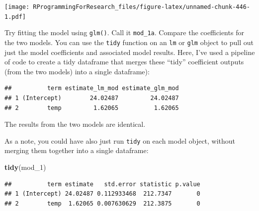\documentclass[]{book}
\makeatletter
\newenvironment{Shaded}{\begin{snugshade}}{\end{snugshade}}
\newcommand{\KeywordTok}[1]{\textcolor[rgb]{0.13,0.29,0.53}{\textbf{#1}}}
\newcommand{\DataTypeTok}[1]{\textcolor[rgb]{0.13,0.29,0.53}{#1}}
\newcommand{\DecValTok}[1]{\textcolor[rgb]{0.00,0.00,0.81}{#1}}
\newcommand{\StringTok}[1]{\textcolor[rgb]{0.31,0.60,0.02}{#1}}
\newcommand{\OperatorTok}[1]{\textcolor[rgb]{0.81,0.36,0.00}{\textbf{#1}}}
\newcommand{\NormalTok}[1]{#1}
\newenvironment{kframe}{%
\medskip{}
\setlength{\fboxsep}{.8em}
 \def\at@end@of@kframe{}%
 \ifinner\ifhmode%
  \def\at@end@of@kframe{\end{minipage}}%
  \begin{minipage}{\columnwidth}%
 \fi\fi%
 \def\FrameCommand##1{\hskip\@totalleftmargin \hskip-\fboxsep
 \colorbox{shadecolor}{##1}\hskip-\fboxsep
     \hskip-\linewidth \hskip-\@totalleftmargin \hskip\columnwidth}%
 \MakeFramed {\advance\hsize-\width
   \@totalleftmargin\z@ \linewidth\hsize
   \@setminipage}}%
 {\par\unskip\endMakeFramed%
 \at@end@of@kframe}
\renewenvironment{Shaded}{\begin{kframe}}{\end{kframe}}
\theoremstyle{definition}
\theoremstyle{definition}
\theoremstyle{definition}
\theoremstyle{remark}
\makeatother
\begin{document}
\texttt{[image: RProgrammingForResearch\_files/figure-latex/unnamed-chunk-446-1.pdf]}

Try fitting the model using \texttt{glm()}. Call it \texttt{mod\_1a}.
Compare the coefficients for the two models. You can use the
\texttt{tidy} function on an \texttt{lm} or \texttt{glm} object to pull
out just the model coefficients and associated model results. Here, I've
used a pipeline of code to create a tidy dataframe that merges these
``tidy'' coefficient outputs (from the two models) into a single
dataframe):

\begin{Shaded}
\end{Shaded}

\begin{verbatim}
##          term estimate_lm_mod estimate_glm_mod
## 1 (Intercept)        24.02487         24.02487
## 2        temp         1.62065          1.62065
\end{verbatim}

The results from the two models are identical.

As a note, you could have also just run \texttt{tidy} on each model
object, without merging them together into a single dataframe:

\begin{Shaded}
\begin{Highlighting}[]
\KeywordTok{tidy}\NormalTok{(mod_}\DecValTok{1}\NormalTok{)}
\end{Highlighting}
\end{Shaded}

\begin{verbatim}
##          term estimate   std.error statistic p.value
## 1 (Intercept) 24.02487 0.112933468  212.7347       0
## 2        temp  1.62065 0.007630629  212.3875       0
\end{verbatim}
\end{document}

